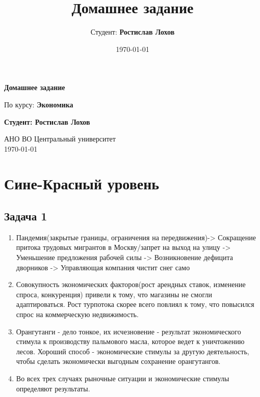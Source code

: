 \documentclass[a4paper,12pt]{article}
\title{Домашнее задание}
\author{Студент: \textbf{Ростислав Лохов}}
\date{\today}
\begin{document}
\begin{titlepage}
    \centering
    \vspace*{1cm}

    \Huge
    \textbf{Домашнее задание}

    \vspace{0.5cm}
    \LARGE
    По курсу: \textbf{Экономика}

    \vspace{1.5cm}

    \textbf{Студент: Ростислав Лохов}

    \vfill

    \Large
    АНО ВО Центральный университет\\
    \vspace{0.3cm}
    \today

\end{titlepage}

\tableofcontents
\newpage

\section{Сине-Красный уровень}


\subsection{Задача 1}
\begin{enumerate}
    \item Пандемия(закрытые границы, ограничения на передвижения)-> Сокращение притока трудовых мигрантов в Москву/запрет на выход на улицу -> Уменьшение предложения рабочей силы -> Возникновение дефицита дворников -> Управляющая компания чистит снег само
    \item Совокупность экономических факторов(рост арендных ставок, изменение спроса, конкуренция) привели к тому, что магазины не смогли адаптироваться. Рост турпотока скорее всего повлиял к тому, что повысился спрос на коммерческую недвижимость.
    \item Орангутанги - дело тонкое, их исчезновение - результат экономического стимула к производству пальмового масла, которое ведет к уничтожению лесов. Хороший способ - экономические стимулы за другую деятельность, чтобы сделать экономически выгодным сохранение орангутангов.
    \item Во всех трех случаях рыночные ситуации и экономические стимулы определяют результаты.
\end{enumerate}
\end{document}
